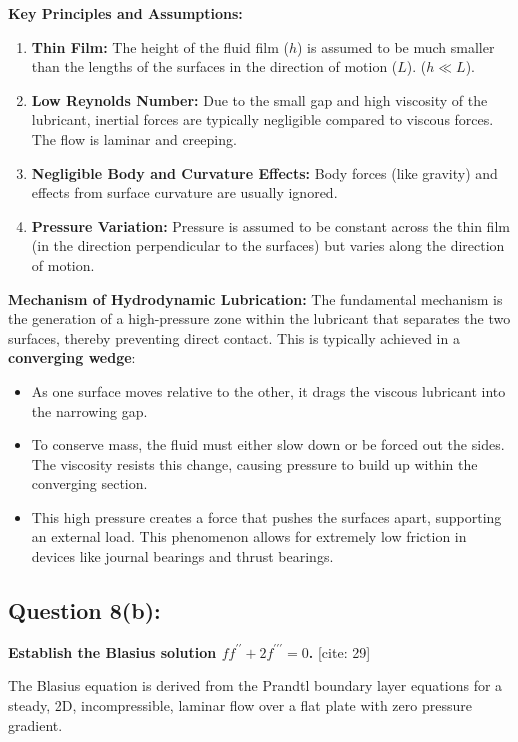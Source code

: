 \documentclass{article}
\begin{document}
\textbf{Key Principles and Assumptions:}
\begin{enumerate}
    \item \textbf{Thin Film:} The height of the fluid film ($h$) is assumed to be much smaller than the lengths of the surfaces in the direction of motion ($L$). ($h \ll L$).
    \item \textbf{Low Reynolds Number:} Due to the small gap and high viscosity of the lubricant, inertial forces are typically negligible compared to viscous forces. The flow is laminar and creeping.
    \item \textbf{Negligible Body and Curvature Effects:} Body forces (like gravity) and effects from surface curvature are usually ignored.
    \item \textbf{Pressure Variation:} Pressure is assumed to be constant across the thin film (in the direction perpendicular to the surfaces) but varies along the direction of motion.
\end{enumerate}

\textbf{Mechanism of Hydrodynamic Lubrication:}
The fundamental mechanism is the generation of a high-pressure zone within the lubricant that separates the two surfaces, thereby preventing direct contact. This is typically achieved in a \textbf{converging wedge}:
\begin{itemize}
    \item As one surface moves relative to the other, it drags the viscous lubricant into the narrowing gap.
    \item To conserve mass, the fluid must either slow down or be forced out the sides. The viscosity resists this change, causing pressure to build up within the converging section.
    \item This high pressure creates a force that pushes the surfaces apart, supporting an external load. This phenomenon allows for extremely low friction in devices like journal bearings and thrust bearings.
\end{itemize}
\hrulefill

\subsection*{\textbf{Question 8(b):}}
\textbf{Establish the Blasius solution $ff^{\prime\prime}+2f^{\prime\prime\prime}=0$.} [cite: 29]

The Blasius equation is derived from the Prandtl boundary layer equations for a steady, 2D, incompressible, laminar flow over a flat plate with zero pressure gradient.
\end{document}
